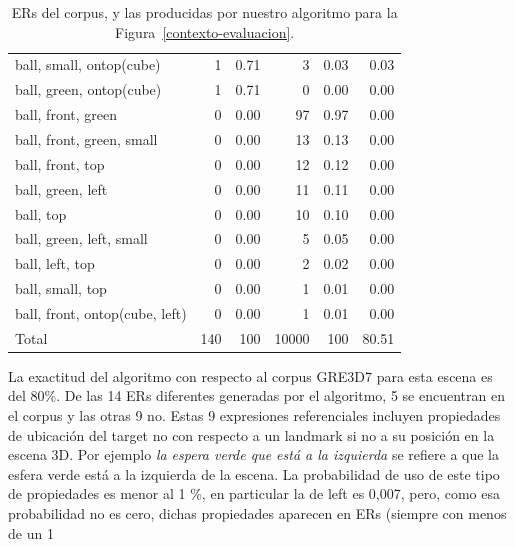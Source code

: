 \begin{table}[H]
\begin{table}[H]
\begin{small}
\begin{center}
\begin{tabular}{|l|r|r|r|r|r|}
ball, small, ontop(cube)                       &  1 &  0.71 &    3 &  0.03 &  0.03 \\
ball, green, ontop(cube)                       &  1 &  0.71 &    0 &  0.00 &  0.00\\
ball, front, green                              &  0 &  0.00 &   97 &  0.97 &  0.00\\
ball, front, green, small                        &  0 &  0.00 &   13 &  0.13 &  0.00\\
ball, front, top                                &  0 &  0.00 &   12 &  0.12 &  0.00\\
ball, green, left	                              &  0 &  0.00 &   11 &  0.11 &  0.00\\
ball, top                                      &  0 &  0.00 &   10 &  0.10 &  0.00\\
ball, green, left, small                         &  0 &  0.00 &    5 &  0.05 &  0.00\\
ball, left, top                                 &  0 &  0.00 &    2 &  0.02 &  0.00\\
ball, small, top                                &  0 &  0.00 &    1 &  0.01 &  0.00\\
ball, front, ontop(cube, left)                  &  0 &  0.00 &    1 &  0.01 &  0.00\\

\hline
Total & 140 & 100 & 10000 & 100 & 80.51 \\
\hline
\end{tabular}
\caption{ERs del corpus, y las producidas por nuestro algoritmo para la Figura~\ref{contexto-evaluacion}.\label{results-algo-fig3}}
\vspace*{-.5cm}
\end{center}
\end{small}
\end{table}

 La exactitud del algoritmo con respecto al corpus GRE3D7 para esta escena es del 80\%. De las 14 ERs diferentes generadas por el algoritmo, 5 se encuentran en el corpus y las otras 9 no. Estas 9 expresiones referenciales incluyen propiedades de ubicaci\'on del target no con respecto a un landmark si no a su posici\'on en la escena 3D. Por ejemplo \emph{la espera verde que est\'a a la izquierda} se refiere a que la esfera verde est\'a a la izquierda de la escena.  La probabilidad de uso de este tipo de propiedades es menor al 1 \%, en particular la de left es 0,007, pero, como esa probabilidad no es cero, dichas propiedades aparecen en ERs (siempre con menos de un 1%


\end{table}
